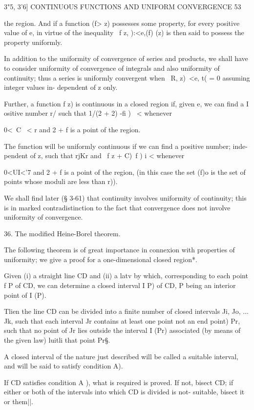 3"5, 3'6] CONTINUOUS FUNCTIONS AND UNIFORM CONVERGENCE 53

the region. And if a function (f> z) possesses some property, for
every positive value of e, in virtue of the inequality \ f z, ):<e,(f)
(z) is then said to possess the property uniformly.

In addition to the uniformity of convergence of series and products,
we shall have to consider uniformity of convergence of integrals and
also uniformity of continuity; thus a series is uniformly convergent
when \ R, z)\ <e, t( = 0 assuming integer values in- dependent of z
only.

Further, a function f z) is continuous in a closed region if, given e,
we can find a I ositive number r/ such that 1/(2 + 2) -fi ) \ <
whenever

0<\ C \ < r and 2 + f is a point of the region.

The function will be uniformly continuous if we can find a positive
number; inde- pendent of z, such that rjKr and \ f z + C)~f ) i <
whenever

0<UI<'7 and 2 + f is a point of the region, (in this case the set (f)o
is the set of points whose moduli are less than r)).

We shall find later (§ 3-61) that continuity involves uniformity of
continuity; this is in marked contradistinction to the fact that
convergence does not involve uniformity of convergence.

36. The modified Heine-Borel theorem.

The following theorem is of great importance in connexion with
properties of uniformity; we give a proof for a one-dimensional
closed region*.

Given (i) a straight line CD and (ii) a latv by which, corresponding
to each point f P of CD, we can determine a closed interval I P) of
CD, P being an interior point of I (P).

Tlien the line CD can be divided into a finite number of closed
intervals Ji, Jo, ... Jk, such that each interval Jr contains at least
one point not an end point) Pr, such that no point of Jr lies outside
the interval I (Pr) associated (by means of the given law) luitli that
point Pr§.

A closed interval of the nature just described will be called a
suitable interval, and will be said to satisfy condition A).

If CD satisfies condition A ), what is required is proved. If not,
bisect CD; if either or both of the intervals into which CD is
divided is not- suitable, bisect it or them||.

